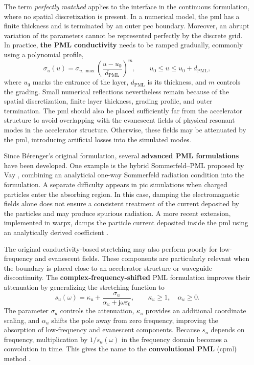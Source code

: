 The term \textit{perfectly matched} applies to the interface in the continuous formulation, where no spatial discretization is present. In a numerical model, the \gls{pml} has a finite thickness and is terminated by an outer \gls{pec} boundary. Moreover, an abrupt variation of its parameters cannot be represented perfectly by the discrete grid. In practice, \textbf{the PML conductivity} needs to be ramped gradually, commonly using a polynomial profile,
%
\begin{equation}
\sigma_u(u)
=
\sigma_{u,\max}
\left(
\frac{u-u_0}{d_{\mathrm{PML}}}
\right)^m,
\qquad
u_0\leq u\leq u_0+d_{\mathrm{PML}},
\label{eq:pml_conductivity_profile}
\end{equation}
%
where $u_0$ marks the entrance of the layer, $d_{\mathrm{PML}}$ is its thickness, and $m$ controls the grading. Small numerical reflections nevertheless remain because of the spatial discretization, finite layer thickness, grading profile, and outer termination. The \gls{pml} should also be placed sufficiently far from the accelerator structure to avoid overlapping with the evanescent fields of physical resonant modes in the accelerator structure. Otherwise, these fields may be attenuated by the \gls{pml}, introducing artificial losses into the simulated modes.

Since Bérenger's original formulation, several \textbf{advanced PML formulations} have been developed. One example is the hybrid Sommerfeld--PML proposed by Vay
\cite{VAY2000511}, combining an analyticial one-way Sommerfeld radiation condition into the formulation. A separate difficulty appears in \gls{pic} simulations when charged particles enter the absorbing region. In this case, damping the electromagnetic fields alone does not ensure a consistent treatment of the current deposited by the particles and may produce spurious radiation. A more recent extension, implemented in \gls{warpx}, damps the particle current deposited inside the \gls{pml} using an analytically derived coefficient
\cite{lehePhysRevE.106.045306}.

The original conductivity-based stretching may also perform poorly for low-frequency and evanescent fields. These components are particularly relevant when the boundary is placed close to an accelerator structure or waveguide discontinuity. The \textbf{complex-frequency-shifted} PML formulation improves their attenuation by generalizing the stretching function to
%
\begin{equation}
s_u(\omega) =
\kappa_u
+
\frac{\sigma_u}
{\alpha_u+\mathrm{j}\omega\varepsilon_0},
\qquad
\kappa_u\geq 1,
\quad
\alpha_u\geq 0.
\label{eq:cpml_stretching_function}
\end{equation}
%
The parameter $\sigma_u$ controls the attenuation, $\kappa_u$ provides an additional coordinate scaling, and $\alpha_u$ shifts the pole away from zero frequency, improving the absorption of low-frequency and evanescent components. Because $s_u$ depends on frequency, multiplication by $1/s_u(\omega)$ in the frequency domain becomes a convolution in time. This gives the name to the \textbf{convolutional PML} (\gls{cpml}) method \cite{RodenCPML}.

